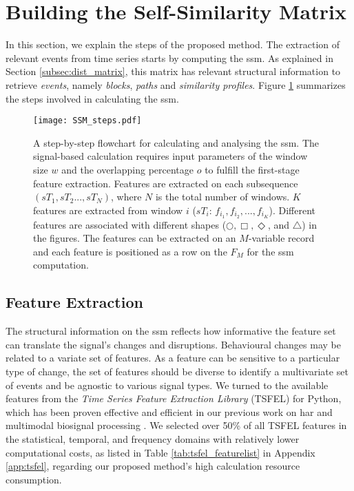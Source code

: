 \section{Building the Self-Similarity Matrix}

In this section, we explain the steps of the proposed method. The extraction of relevant events from time series starts by computing the \gls{ssm}. As explained in Section \ref{subsec:dist_matrix}, this matrix has relevant structural information to retrieve \textit{events}, namely \textit{blocks}, \textit{paths} and \textit{similarity profiles}. Figure \ref{fig:SSM_scheme} summarizes the steps involved in calculating the \gls{ssm}.

\begin{figure}
\centering
    \texttt{[image: SSM\_steps.pdf]}
    \caption{A step-by-step flowchart for calculating and analysing the \gls{ssm}. The signal-based calculation requires input parameters of the window size $w$ and the overlapping percentage $o$ to fulfill the first-stage feature extraction. Features are extracted on each subsequence $(sT_1, sT_2..., sT_N)$, where $N$ is the total number of windows. $K$ features are extracted from window $i$ ($sT_i$: $f_{i_1}, f_{i_2}, ..., f_{i_K}$). Different features are associated with different shapes ($\bigcirc, \Box, \Diamond$, and $\triangle$) in the figures. The features can be extracted on an $M$-variable record and each feature is positioned as a row on the $F_M$ for the \gls{ssm} computation.}
    \label{fig:SSM_scheme}
\end{figure}

\subsection{Feature Extraction}

The structural information on the \gls{ssm} reflects how informative the feature set can translate the signal's changes and disruptions. Behavioural changes may be related to a variate set of features. As a feature can be sensitive to a particular type of change, the set of features should be diverse to identify a multivariate set of events and be agnostic to various signal types. We turned to the available features from the \textit{Time Series Feature Extraction Library} (TSFEL) \cite{barandas_tsfel_2020} for Python, which has been proven effective and efficient in our previous work on \gls{har} and multimodal biosignal processing \cite{liu22pipeline, liu2021thesis}. We selected over 50\% of all TSFEL features in the statistical, temporal, and frequency domains with relatively lower computational costs, as listed in Table \ref{tab:tsfel_featurelist} in Appendix \ref{app:tsfel}, regarding our proposed method's high calculation resource consumption.

